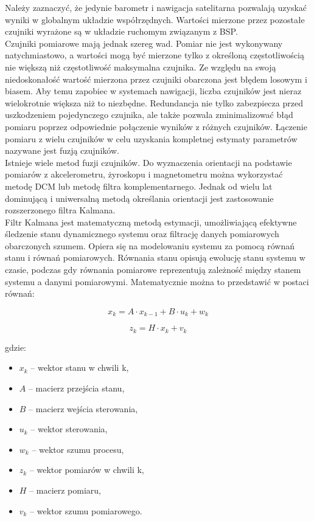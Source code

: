 Należy zaznaczyć, że jedynie barometr i nawigacja satelitarna pozwalają uzyskać wyniki w globalnym układzie współrzędnych. Wartości mierzone przez pozostałe czujniki wyrażone są w układzie ruchomym związanym z BSP.\\

Czujniki pomiarowe mają jednak szereg wad. Pomiar nie jest wykonywany natychmiastowo, a wartości mogą być mierzone tylko z określoną częstotliwością nie większą niż częstotliwość maksymalna czujnika. Ze względu na swoją niedoskonałość wartość mierzona przez czujniki obarczona jest błędem losowym i biasem. Aby temu zapobiec w systemach nawigacji, liczba czujników jest nieraz wielokrotnie większa niż to niezbędne. Redundancja nie tylko zabezpiecza przed uszkodzeniem pojedynczego czujnika, ale także pozwala zminimalizować błąd pomiaru poprzez odpowiednie połączenie wyników z różnych czujników. Łączenie pomiaru z wielu czujników w celu uzyskania kompletnej estymaty parametrów nazywane jest fuzją czujników.\\

Istnieje wiele metod fuzji czujników. Do wyznaczenia orientacji na podstawie pomiarów z akcelerometru, żyroskopu i magnetometru można wykorzystać metodę DCM lub metodę filtra komplementarnego. Jednak od wielu lat dominującą i uniwersalną metodą określania orientacji jest zastosowanie rozszerzonego filtra Kalmana.\\

Filtr Kalmana jest matematyczną metodą estymacji, umożliwiającą efektywne śledzenie stanu dynamicznego systemu oraz filtrację danych pomiarowych obarczonych szumem.
Opiera się na modelowaniu systemu za pomocą równań stanu i równań pomiarowych. Równania stanu opisują ewolucję stanu systemu w czasie, podczas gdy równania pomiarowe reprezentują zależność między stanem systemu a danymi pomiarowymi. Matematycznie można to przedstawić w postaci równań:

\[
  x_k = A \cdot x_{k-1} + B \cdot u_k + w_k
\]

\[
  z_k = H \cdot x_k + v_k
\]

gdzie:
\begin{itemize}
  \item $x_k$ -- wektor stanu w chwili k, 
  \item $A$ -- macierz przejścia stanu, 
  \item $B$  -- macierz wejścia sterowania, 
  \item $u_k$  -- wektor sterowania, 
  \item $w_k$ -- wektor szumu procesu, 
  \item $z_k$  -- wektor pomiarów w chwili  k, 
  \item $H$ -- macierz pomiaru,
  \item $v_k$ -- wektor szumu pomiarowego.
\end{itemize}

